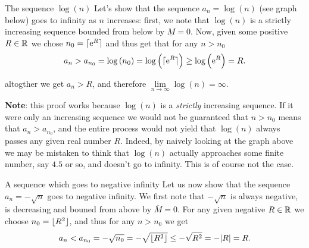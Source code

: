 \vspace{2em}
\begin{example}{The sequence $\log(n)$}{}
	Let's show that the sequence $a_{n}=\log(n)$ (see graph below) goes to infinity as $n$ increases: first, we note that $\log(n)$ is a strictly increasing sequence bounded from below by $\underline{M}=0$. Now, given some positive $R\in\mathbb{R}^{}$ we chose $n_{0}=\lceil \mathrm{e}^{R} \rceil$ and thus get that for any $n>n_{0}$
	\[
		a_{n} > a_{n_{0}} = \log\left(n_{0}\right) = \log\left(\lceil \mathrm{e}^{R} \rceil\right) \geq \log\left(\mathrm{e}^{R}\right) = R.
	\]

	altogther we get $a_{n}>R$, and therefore $\lim\limits_{n\to\infty}\log(n)=\infty$.

	\vspace{2em}
	\begin{center}
	\end{center}

	\textbf{Note}: this proof works because $\log(n)$ is a \textit{strictly} increasing sequence. If it were only an increasing sequence we would not be guaranteed that $n>n_{0}$ means that $a_{n}>a_{n_{0}}$, and the entire process would not yield that $\log(n)$ always passes any given real number $R$. Indeed, by naively looking at the graph above we may be mistaken to think that $\log(n)$ actually approaches some finite number, say $4.5$ or so, and doesn't go to infinity. This is of course not the case.
\end{example}

\begin{example}{A sequence which goes to negative infinity}{}
	Let us now show that the sequence $a_{n}=-\sqrt{n}$ goes to negative infinity. We first note that $-\sqrt{n}$ is always negative, is decreasing and bouned from above by $\overline{M}=0$. For any given negative $R\in\mathbb{R}^{}$ we choose $n_{0}=\lfloor R^{2} \rfloor$, and thus for any $n>n_{0}$ we get
	\[
		a_{n} < a_{n_{0}} = -\sqrt{n_{0}} = -\sqrt{\lfloor R^{2} \rfloor} \leq -\sqrt{R^{2}} = -|R| = R.
	\]

\end{example}

